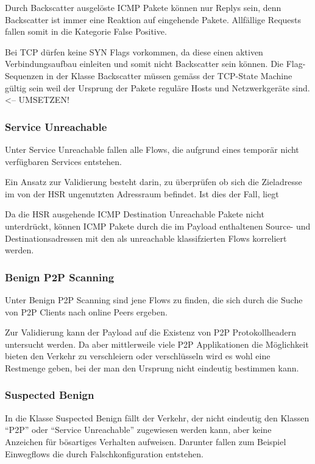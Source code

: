 \documentclass[a4paper]{scrartcl}
\begin{document}
Durch Backscatter ausgelöste ICMP Pakete können nur Replys sein, denn Backscatter ist immer eine Reaktion auf eingehende Pakete. Allfällige Requests fallen somit in die Kategorie False Positive.

Bei TCP dürfen keine SYN Flags vorkommen, da diese einen aktiven Verbindungsaufbau einleiten und somit nicht Backscatter sein können. Die Flag-Sequenzen in der Klasse Backscatter müssen gemäss der TCP-State Machine gültig sein weil der Ursprung der Pakete reguläre Hosts und Netzwerkgeräte sind. <-- UMSETZEN!

\subsubsection{Service Unreachable}
Unter Service Unreachable fallen alle Flows, die aufgrund eines temporär nicht verfügbaren Services entstehen.

Ein Ansatz zur Validierung besteht darin, zu überprüfen ob sich die Zieladresse im von der HSR ungenutzten Adressraum befindet. Ist dies der Fall, liegt 

Da\cite{rfc_icmp} die HSR ausgehende ICMP Destination Unreachable Pakete nicht unterdrückt, können ICMP Pakete durch die im Payload enthaltenen Source- und Destinationsadressen mit den als unreachable klassifzierten Flows korreliert werden.  


\subsubsection{Benign P2P Scanning}
Unter Benign P2P Scanning sind jene Flows zu finden, die sich durch die Suche von P2P Clients nach online Peers ergeben.

Zur Validierung kann der Payload auf die Existenz von P2P Protokollheadern untersucht werden. Da aber mittlerweile viele P2P Applikationen die Möglichkeit bieten den Verkehr zu verschleiern \cite{emule} oder verschlüsseln \cite{vuze} wird es wohl eine Restmenge geben, bei der man den Ursprung nicht eindeutig bestimmen kann.

\subsubsection{Suspected Benign}
In die Klasse Suspected Benign fällt der Verkehr, der nicht eindeutig den Klassen ``P2P'' oder ``Service Unreachable'' zugewiesen werden kann, aber keine Anzeichen für bösartiges Verhalten aufweisen. Darunter fallen zum Beispiel Einwegflows die durch Falschkonfiguration entstehen.
\end{document}
